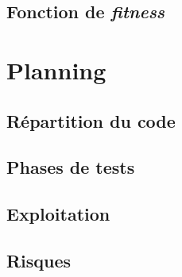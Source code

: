 \subsection{Fonction de \textit{fitness} }

\section{Planning}
\subsection{Répartition du code}

\subsection{Phases de tests}

\subsection{Exploitation}

\subsection{Risques}


